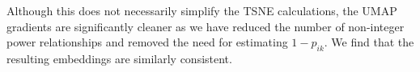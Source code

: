 \documentclass[sigconf, nonacm]{acmart}
\begin{document}
Although this does not necessarily simplify the TSNE calculations, the UMAP gradients are significantly cleaner as we have reduced the number of non-integer
power relationships and removed the need for estimating $1 - p_{ik}$. We find that the resulting embeddings are similarly consistent.

% 
% 
\end{document}
